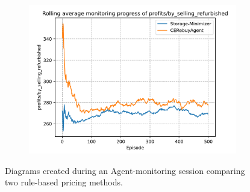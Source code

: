 \begin{figure}[ht]
\begin{subfigure}{0.49\textwidth}
		\label{fig:RulebasedAgentMonitoring2}
	\end{subfigure}
	\begin{subfigure}{0.49\textwidth}
		\centering
		\includegraphics[width = \textwidth]{images/experiments/rulebased/RuleBasedMonitoringProfitsRefurbished.pdf}\\
		\label{fig:RulebasedAgentMonitoring3}
	\end{subfigure}
	\caption{Diagrams created during an Agent-monitoring session comparing two rule-based pricing methods.}\label{fig:RulebasedAgentMonitoring}
\end{figure}

